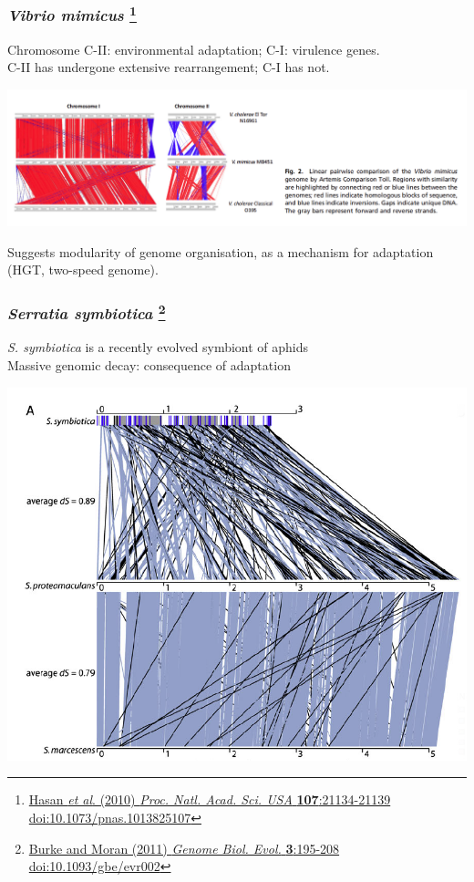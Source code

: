 \begin{frame}
  \frametitle{\textit{Vibrio mimicus} 
  \footnote{\tiny{\href{http://dx.doi.org/10.1073/pnas.1013825107}{Hasan \textit{et al}. (2010) \textit{Proc. Natl. Acad. Sci. USA} \textbf{107}:21134-21139 doi:10.1073/pnas.1013825107}}}
  }
  Chromosome \textcolor{hutton_green}{C-II: environmental adaptation}; C-I: virulence genes.\\
  \textcolor{hutton_green}{C-II has undergone extensive rearrangement}; C-I has not.\\
  \begin{center}
    \includegraphics[width=1\textwidth]{images/v_mimicus}
  \end{center}    
  Suggests \textcolor{hutton_blue}{modularity of genome organisation, as a mechanism for adaptation} (HGT, two-speed genome).
\end{frame}

\begin{frame}
  \frametitle{\textit{Serratia symbiotica} 
  \footnote{\tiny{\href{http://dx.doi.org/10.1093/gbe/evr002}{Burke and Moran (2011) \textit{Genome Biol. Evol.} \textbf{3}:195-208 doi:10.1093/gbe/evr002}}}
  }
  \textit{S. symbiotica} is a recently evolved symbiont of aphids\\
  \textcolor{hutton_green}{Massive genomic decay: consequence of adaptation}\\
  \begin{center}
    \includegraphics[width=0.75\textheight]{images/s_symbiotica}
  \end{center}    
\end{frame}

